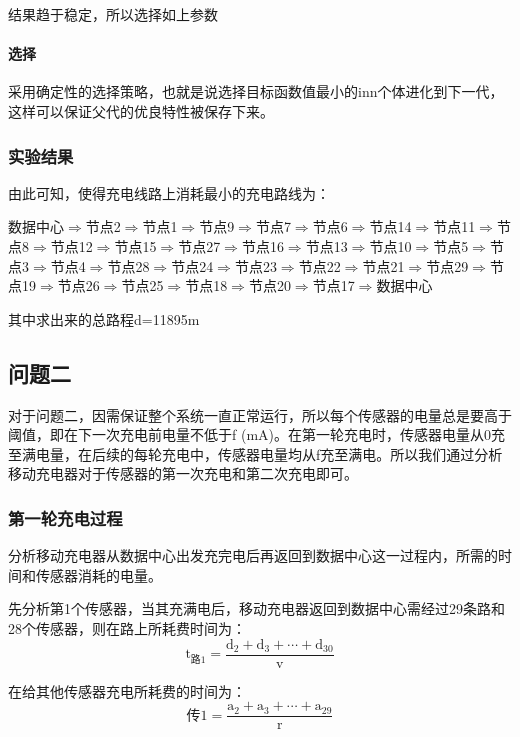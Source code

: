 \documentclass{article}
\begin{document}
结果趋于稳定，所以选择如上参数
\paragraph{选择}
采用确定性的选择策略，也就是说选择目标函数值最小的inn个体进化到下一代，这样可以保证父代的优良特性被保存下来。
\subsubsection{实验结果}
由此可知，使得充电线路上消耗最小的充电路线为：

\vspace{2ex}
\noindent 数据中心$\Rightarrow$节点2\;$\Rightarrow$节点1\;$\Rightarrow$节点9\;$\Rightarrow$节点7\;$\Rightarrow$节点6\;$\Rightarrow$节点14\;$\Rightarrow$节点11\;$\Rightarrow$节点8\;$\Rightarrow$节点12\;$\Rightarrow$节点15\;$\Rightarrow$节点27\;$\Rightarrow$节点16\;$\Rightarrow$节点13\;$\Rightarrow$节点10\;$\Rightarrow$节点5\;$\Rightarrow$节点3\;$\Rightarrow$节点4\;$\Rightarrow$节点28\;$\Rightarrow$节点24\;$\Rightarrow$节点23\;$\Rightarrow$节点22\;$\Rightarrow$节点21$\Rightarrow$节点29\;$\Rightarrow$节点19\;$\Rightarrow$节点26\;$\Rightarrow$节点25\;$\Rightarrow$节点18\;$\Rightarrow$节点20\;$\Rightarrow$节点17\;$\Rightarrow$数据中心
\vspace{2ex}

其中求出来的总路程d=11895m

\subsection{问题二}
对于问题二，因需保证整个系统一直正常运行，所以每个传感器的电量总是要高于阈值，即在下一次充电前电量不低于f (mA)。在第一轮充电时，传感器电量从0充至满电量，在后续的每轮充电中，传感器电量均从f充至满电。所以我们通过分析移动充电器对于传感器的第一次充电和第二次充电即可。
\subsubsection{第一轮充电过程}
分析移动充电器从数据中心出发充完电后再返回到数据中心这一过程内，所需的时间和传感器消耗的电量\cite{ref5}。


先分析第1个传感器，当其充满电后，移动充电器返回到数据中心需经过29条路和28个传感器，则在路上所耗费时间为：
\begin{equation}
    \mathrm{t_{\text {路} 1}=\frac{d_{2}+d_{3}+\cdots+d_{30}}{v}}
    \tag{12}
\end{equation}

在给其他传感器充电所耗费的时间为：
\begin{equation}
    \mathrm{{\text {传} 1}=\frac{a_{2}+a_{3}+\cdots+a_{29}}{r}}
    \tag{13}
\end{equation}
\end{document}
